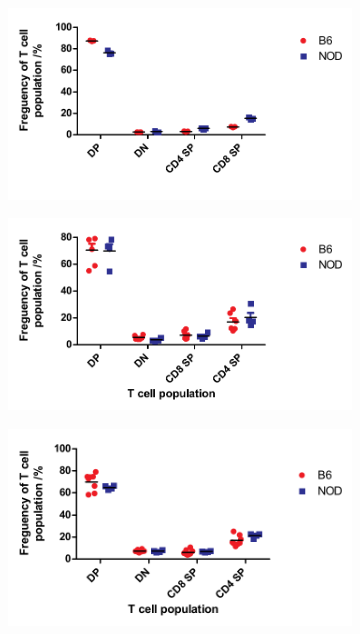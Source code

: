 \begin{figure}
	\begin{subfigure}{0.5\textwidth}
	\caption{}
	\includegraphics[width=\textwidth]{Figures/4wkThyTcells.pdf}
	\label{subfig:4wkThyTcells}
	\end{subfigure}
	\begin{subfigure}{0.5\textwidth}
	\caption{}
 	\includegraphics[width=\textwidth]{Figures/9wkThyTcells.pdf}
	\label{subfig:9wkThyTcells}
	\end{subfigure}
	\begin{subfigure}{0.5\textwidth}
	\centering
	\caption{}
 	\includegraphics[width=\textwidth]{Figures/12wkThyTcells.pdf}

\end{subfigure}
\end{figure}
